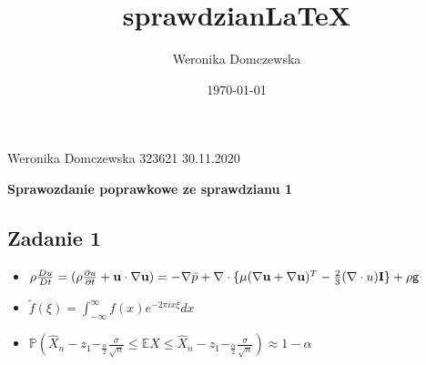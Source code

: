 \documentclass[a4paper]{article}
\author{Weronika Domczewska}
\title{sprawdzian\LaTeX}
\date{\today}
\begin{document}
\noindent \large Weronika Domczewska 323621 \hfill 30.11.2020
\medskip

\begin{center}
{\noindent \bf \large Sprawozdanie poprawkowe ze sprawdzianu 1}
\end{center}

\subsection*{Zadanie 1}

\begin{itemize}
    \item $\rho \frac{Du}{Dt} = (\rho \frac{\partial u}{\partial t} + \textbf u \cdot \nabla \textbf u) =  -\nabla \bar{p} + \nabla \cdot \{\mu (\nabla \textbf{u} + \nabla \textbf{u})^ T - \frac{2}{3} (\nabla \cdot u) \textbf{I}\} + \rho \sf g$ 
\end{itemize}

\begin{itemize}
    \item $\tilde{f} (\xi) = \int_{-\infty}^{\infty} f(x) e^{-2\pi i x \xi} dx$
\end{itemize}

\begin{itemize}
    \item $\mathbb{P}(\hat{X}_n - z_1 - _\frac{\alpha}{2} \frac{\sigma}{\sqrt{n}} \leq \mathbb{E}X \leq \hat{X}_n - z_1 - _\frac{\alpha}{2} \frac{\sigma}{\sqrt{n}}) \approx 1 - \alpha$
\end{itemize}
\end{document}
